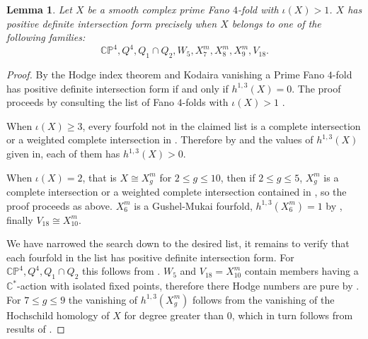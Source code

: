 \documentclass[12pt]{article}
\newtheorem{lemma}[theorem]{Lemma}
\begin{document}
\begin{lemma} \label{fanofourfoldposdef}
Let $X$ be a smooth complex prime Fano $4$-fold with $\iota(X)>1$. $X$ has positive definite intersection form precisely when $X$ belongs to one of the following families: $$\mathbb{CP}^4,Q^4, Q_1 \cap Q_2, W_{5}, X^{m}_{7}, X^{m}_{8},X^{m}_{9}, V_{18}.$$
\end{lemma}
\begin{proof}By the Hodge index theorem and Kodaira vanishing a Prime Fano $4$-fold has positive definite intersection form if and only if $h^{1,3}(X)=0$. The proof proceeds by consulting the list of Fano $4$-folds with $\iota(X)>1$  \cite[Tables 1-4]{CGKS}. 

When $\iota(X) \geq 3$, every fourfold not in the claimed list is a complete intersection or a weighted complete intersection in  \cite[Table 1]{PS}.  Therefore by \cite[Corollary 6.1]{LW} and the values of $h^{1,3}(X)$ given in\cite[Table 1]{PS}, each of them has $h^{1,3}(X)>0$.

When $\iota(X) =2$, that is $X \cong X^{m}_{g}$ for $2 \leq g \leq 10$, then if $2 \leq g \leq 5$, $X^{m}_{g}$ is a complete intersection or a weighted complete intersection contained in \cite[Table 1]{PS}, so the proof proceeds as above. $X^{m}_{6}$ is a Gushel-Mukai fourfold,   $h^{1,3}(X^{m}_{6})=1$ by \cite[Lemma 4.1]{LM}, finally $V_{18} \cong X^{m}_{10}$.

We have narrowed the search down to the desired list, it remains to verify that each fourfold in the list has positive definite intersection form. For $\mathbb{CP}^4,Q^4, Q_1 \cap Q_2$ this follows from \cite[Corollary 6.1]{LW}.  $W_5$ and $V_{18} = X^m_{10}$ contain members having a $\mathbb{C}^*$-action with isolated fixed points, therefore there Hodge numbers are pure by \cite{BB}.  For  $7 \leq g \leq 9$ the vanishing of $h^{1,3}(X^{m}_{g})$  follows from the vanishing of the Hochschild homology of $X$ for degree greater than $0$, which in turn follows from results of \cite{Ku}.
\end{proof}
\end{document}
